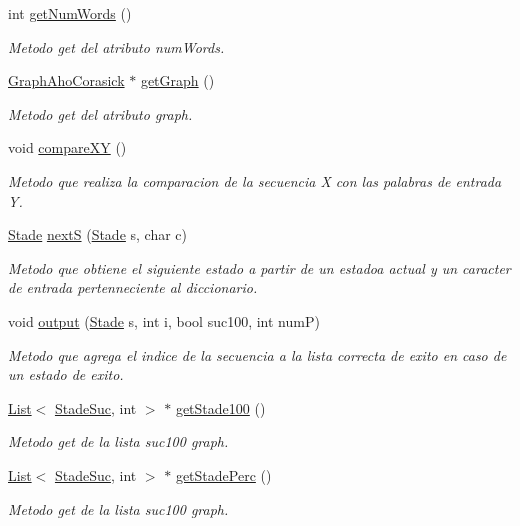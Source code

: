 \begin{DoxyCompactItemize}
int \hyperlink{class_d_n_acompare_a5c2ec87d4157c3db16cdb775d0cbf68b}{get\+Num\+Words} ()
\begin{DoxyCompactList}\small\item\em Metodo get del atributo num\+Words. \end{DoxyCompactList}\item 
\hyperlink{class_graph_aho_corasick}{Graph\+Aho\+Corasick} $\ast$ \hyperlink{class_d_n_acompare_ae255784a3f7565bf9383642ab5b3f842}{get\+Graph} ()
\begin{DoxyCompactList}\small\item\em Metodo get del atributo graph. \end{DoxyCompactList}\item 
void \hyperlink{class_d_n_acompare_a1406488005fa9a39390dc71561732d6c}{compare\+X\+Y} ()
\begin{DoxyCompactList}\small\item\em Metodo que realiza la comparacion de la secuencia X con las palabras de entrada Y. \end{DoxyCompactList}\item 
\hyperlink{class_stade}{Stade} \hyperlink{class_d_n_acompare_a9b09e4eb3aa5d8306ccc0102e1180cb7}{next\+S} (\hyperlink{class_stade}{Stade} s, char c)
\begin{DoxyCompactList}\small\item\em Metodo que obtiene el siguiente estado a partir de un estadoa actual y un caracter de entrada pertenneciente al diccionario. \end{DoxyCompactList}\item 
void \hyperlink{class_d_n_acompare_af26cd5f7adf3bd85253230d9cd816f4d}{output} (\hyperlink{class_stade}{Stade} s, int i, bool suc100, int num\+P)
\begin{DoxyCompactList}\small\item\em Metodo que agrega el indice de la secuencia a la lista correcta de exito en caso de un estado de exito. \end{DoxyCompactList}\item 
\hyperlink{class_list}{List}$<$ \hyperlink{class_stade_suc}{Stade\+Suc}, int $>$ $\ast$ \hyperlink{class_d_n_acompare_abdbd00b0d1308ec1f60041b7091ae415}{get\+Stade100} ()
\begin{DoxyCompactList}\small\item\em Metodo get de la lista suc100 graph. \end{DoxyCompactList}\item 
\hyperlink{class_list}{List}$<$ \hyperlink{class_stade_suc}{Stade\+Suc}, int $>$ $\ast$ \hyperlink{class_d_n_acompare_a9be3f0c595cf73a5630b0af96617c6b8}{get\+Stade\+Perc} ()
\begin{DoxyCompactList}\small\item\em Metodo get de la lista suc100 graph. \end{DoxyCompactList}\end{DoxyCompactItemize}


